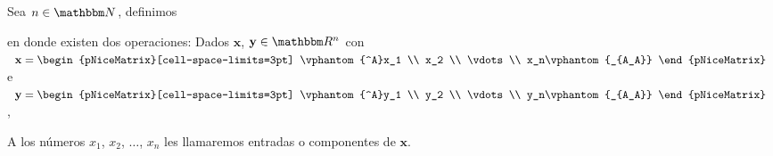 \begin{definicion}{}{}
    Sea $n \in \NN$, definimos
    \begin{matrizn}
    \end{matrizn}
    en donde existen dos operaciones: Dados $\mathbf{x}$, $\mathbf{y} \in \RR[n]$ con \(\mathbf{x} = \begin{pNiceMatrix}[cell-space-limits=3pt] \vphantom{^A}x_1 \\ x_2 \\ \vdots \\ x_n\vphantom{_{A_A}} \end{pNiceMatrix}\) e \(\mathbf{y} = \begin{pNiceMatrix}[cell-space-limits=3pt] \vphantom{^A}y_1 \\ y_2 \\ \vdots \\ y_n\vphantom{_{A_A}} \end{pNiceMatrix}\),
    \begin{matrizn}
    \end{matrizn}
    A los números $x_1$, $x_2$, $\dots$, $x_n$ les llamaremos entradas o componentes de $\mathbf{x}$.
\end{definicion}

